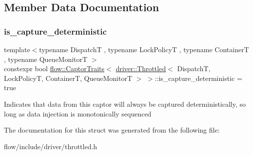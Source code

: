 \subsection{Member Data Documentation}
\mbox{\label{structflow_1_1_captor_traits_3_01driver_1_1_throttled_3_01_dispatch_t_00_01_lock_policy_t_00_01_a55b272e8914e815b1e61540d6e370f1_a9f7dab8a0536fda23364cc6f86e8fc74}} 
\subsubsection{\texorpdfstring{is\+\_\+capture\+\_\+deterministic}{is\_capture\_deterministic}}
{\footnotesize\ttfamily template$<$typename DispatchT , typename Lock\+PolicyT , typename ContainerT , typename Queue\+MonitorT $>$ \\
constexpr bool \hyperlink{structflow_1_1_captor_traits}{flow\+::\+Captor\+Traits}$<$ \hyperlink{classflow_1_1driver_1_1_throttled}{driver\+::\+Throttled}$<$ DispatchT, Lock\+PolicyT, ContainerT, Queue\+MonitorT $>$ $>$\+::is\+\_\+capture\+\_\+deterministic = true\hspace{0.3cm}{\ttfamily [static]}}

Indicates that data from this captor will always be captured deterministically, so long as data injection is monotonically sequenced 

The documentation for this struct was generated from the following file\+:\begin{DoxyCompactItemize}
\item 
flow/include/driver/throttled.\+h\end{DoxyCompactItemize}
